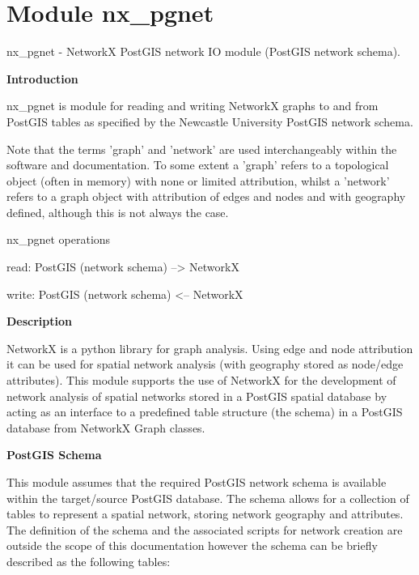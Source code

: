 %
%
%


\section{Module nx\_pgnet}

    \label{nx_pgnet}
nx\_pgnet - NetworkX PostGIS network IO module (PostGIS network schema).

\textbf{Introduction}

nx\_pgnet is module for reading and writing NetworkX graphs to and from 
PostGIS tables as specified by the Newcastle University PostGIS network 
schema.

Note that the terms 'graph' and 'network' are used interchangeably within 
the software and documentation. To some extent a 'graph' refers to a 
topological object (often in memory) with none or limited attribution, 
whilst a 'network' refers to a graph object with attribution of edges and 
nodes and with geography defined, although this is not always the case.

nx\_pgnet operations

read: PostGIS (network schema) --{\textgreater} NetworkX

write: PostGIS (network schema) {\textless}-- NetworkX

\textbf{Description}

NetworkX is a python library for graph analysis. Using edge and node 
attribution it can be used for spatial network analysis (with geography 
stored as node/edge attributes). This module supports the use of NetworkX 
for the development of network analysis of spatial networks stored in a 
PostGIS spatial database by acting as an interface to a predefined table 
structure (the schema) in a PostGIS database from NetworkX Graph classes.

\textbf{PostGIS Schema}

This module assumes that the required PostGIS network schema is available 
within the target/source PostGIS database. The schema allows for a 
collection of tables to represent a spatial network, storing network 
geography and attributes. The definition of the schema and the associated 
scripts for network creation are outside the scope of this documentation 
however the schema can be briefly described as the following tables:

